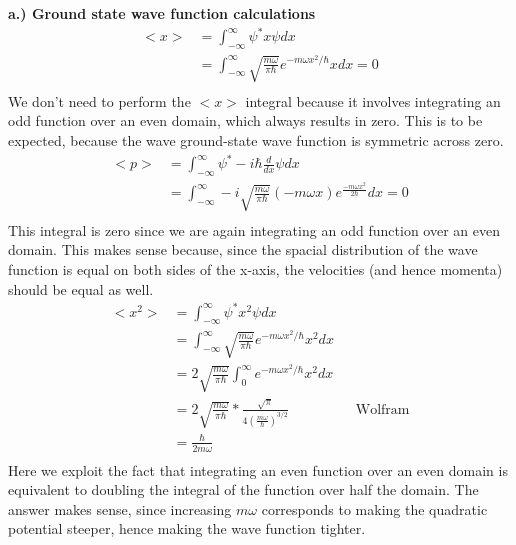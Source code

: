 \documentclass[10pt]{article} %
\begin{document}
\textbf{a.) Ground state wave function calculations}
\begin{align*}
  <x> &= \int_{-\infty}^{\infty} \psi^*x\psi dx\\
  &= \int_{-\infty}^{\infty} \sqrt{\frac{m\omega}{\pi\hbar}}e^{-m\omega x^2 / \hbar}x dx = 0\\
\end{align*}
We don't need to perform the $<x>$ integral because it involves integrating an odd function over
an even domain, which always results in zero. This is to be expected, because the wave ground-state
wave function is symmetric across zero.\\

\begin{align*}
  <p> &= \int_{-\infty}^{\infty} \psi^* -i\hbar \frac{d}{dx}\psi dx\\
  &= \int_{-\infty}^{\infty}
  -i\sqrt{\frac{m\omega}{\pi\hbar}}(-m\omega x)e^{\frac{-m\omega x^2}{2\hbar}}dx = 0\\
\end{align*}
This integral is zero since we are again integrating an odd function over an even domain. This
makes sense because, since the spacial distribution of the wave function is equal on both sides
of the x-axis, the velocities (and hence momenta) should be equal as well.\\

\begin{align*}
  <x^2> &= \int_{-\infty}^{\infty} \psi^*x^2\psi dx\\
  &= \int_{-\infty}^{\infty} \sqrt{\frac{m\omega}{\pi\hbar}}e^{-m\omega x^2 / \hbar}x^2 dx\\
  &= 2\sqrt{\frac{m\omega}{\pi\hbar}}\int_{0}^{\infty} e^{-m\omega x^2 / \hbar}x^2 dx\\
  &= 2\sqrt{\frac{m\omega}{\pi\hbar}} *
  \frac{\sqrt{\pi}}{4(\frac{m\omega}{\hbar})^{3/2}} \hspace{2cm}\mbox{Wolfram}\\
  &= \frac{\hbar}{2m\omega}\\
\end{align*}
Here we exploit the fact that integrating an even function over an even domain is equivalent to
doubling the integral of the function over half the domain. The answer makes sense, since increasing
$m\omega$ corresponds to making the quadratic potential steeper, hence making the wave function
tighter.\\
\end{document}
